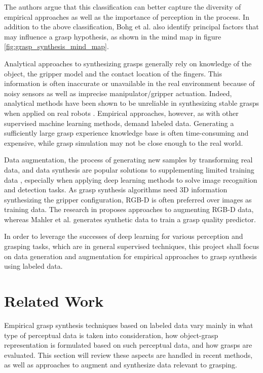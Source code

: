The authors argue that this classification can better capture the diversity of empirical approaches as well as
the importance of perception in the process. In addition to the above classification, Bohg et al. \cite{Bohg2014}
also identify principal factors that may influence a grasp hypothesis, as shown in the mind map in figure
\ref{fig:grasp_synthesis_mind_map}.

Analytical approaches to synthesizing grasps generally rely on knowledge of the object, the gripper model and the
contact location of the fingers. This information is often inaccurate or unavailable in the real environment
because of noisy sensors as well as imprecise manipulator/gripper actuation. Indeed, analytical methods have been
shown to be unreliable in synthesizing stable grasps when applied on real robots
\cite{Kappler2015,Rubert2017,WeiszAllen2012}. Empirical approaches, however, as with other supervised machine
learning methods, demand labeled data. Generating a sufficiently large grasp experience knowledge base is often
time-consuming and expensive, while grasp simulation may not be close enough to the real world.

Data augmentation, the process of generating new samples by transforming real data, and data synthesis are popular
solutions to supplementing limited training data \cite{Fawzi2016,Shrivastava2017}, especially when applying deep
learning methods to solve image recognition and detection tasks. As grasp synthesis algorithms need 3D information
synthesizing the gripper configuration, RGB-D is often preferred over images as training data. The research in
\cite{Eitel2015,Gupta2014RGBDFeatures} proposes approaches to augmenting RGB-D data, whereas Mahler et al.
\cite{mahler2017} generates synthetic data to train a grasp quality predictor.

In order to leverage the successes of deep learning for various perception and grasping tasks, which are in general
supervised techniques, this project shall focus on data generation and augmentation for empirical approaches to grasp
synthesis using labeled data.

\pagebreak
\section{Related Work}
Empirical grasp synthesis techniques based on labeled data vary mainly in what type of perceptual data is taken into
consideration, how object-grasp representation is formulated based on such perceptual data, and how grasps are
evaluated. This section will review these aspects are handled in recent methods, as well as approaches to augment and
synthesize data relevant to grasping.

